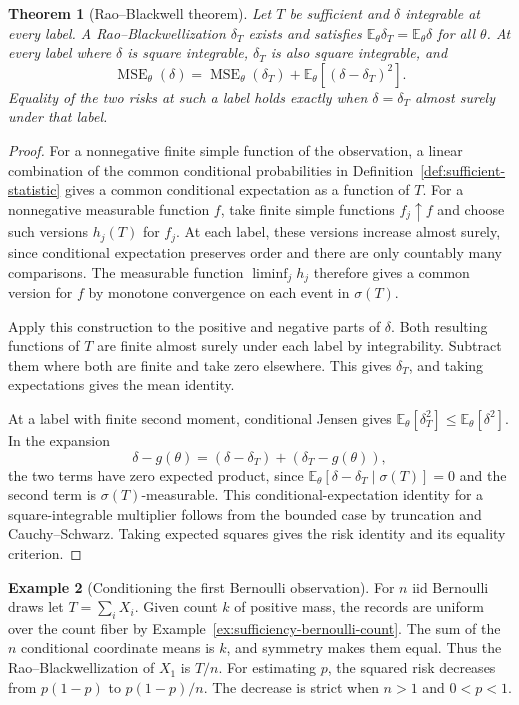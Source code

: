 \documentclass[11pt,oneside]{book}
\newtheorem{theorem}{Theorem}[chapter]
\theoremstyle{definition}
\newtheorem{example}[theorem]{Example}
\theoremstyle{remark}
\begin{document}
\begin{theorem}[Rao--Blackwell theorem]
\label{thm:rao-blackwell-squared-risk}
Let $T$ be sufficient and $\delta$ integrable at every label.
A Rao--Blackwellization $\delta_T$ exists and satisfies
$\mathbb E_\theta\delta_T=\mathbb E_\theta\delta$ for all $\theta$.
At every label where $\delta$ is square integrable, $\delta_T$ is
also square integrable, and
\[
\operatorname{MSE}_\theta(\delta)
=\operatorname{MSE}_\theta(\delta_T)
 +\mathbb E_\theta[(\delta-\delta_T)^2].
\]
Equality of the two risks at such a label holds exactly when
$\delta=\delta_T$ almost surely under that label.
\end{theorem}
\begin{proof}
For a nonnegative finite simple function of the observation,
a linear combination of the common conditional probabilities in
Definition~\ref{def:sufficient-statistic} gives a common conditional
expectation as a function of $T$. For a nonnegative measurable
function $f$, take finite simple functions $f_j\uparrow f$ and choose
such versions $h_j(T)$ for $f_j$. At each label, these versions
increase almost surely, since conditional expectation preserves
order and there are only countably many comparisons. The measurable
function $\liminf_j h_j$ therefore gives a common version for $f$
by monotone convergence on each event in $\sigma(T)$.

Apply this construction to the positive and negative parts of $\delta$.
Both resulting functions of $T$ are finite almost surely under each
label by integrability. Subtract them where both are finite and take
zero elsewhere. This gives $\delta_T$, and taking expectations
gives the mean identity.

At a label with finite second moment, conditional Jensen gives
$\mathbb E_\theta[\delta_T^2]\leq\mathbb E_\theta[\delta^2]$.
In the expansion
\[
\delta-g(\theta)=(\delta-\delta_T)+(\delta_T-g(\theta)),
\]
the two terms have zero expected product, since
$\mathbb E_\theta[\delta-\delta_T\mid\sigma(T)]=0$ and the second
term is $\sigma(T)$-measurable. This conditional-expectation
identity for a square-integrable multiplier follows from the bounded
case by truncation and Cauchy--Schwarz. Taking expected squares
gives the risk identity and its equality criterion.
\end{proof}

\begin{example}[Conditioning the first Bernoulli observation]
\label{ex:rao-blackwell-first-bernoulli}
For $n$ iid Bernoulli draws let $T=\sum_i X_i$. Given count $k$ of
positive mass, the records are uniform over the count fiber by
Example~\ref{ex:sufficiency-bernoulli-count}. The sum of the $n$
conditional coordinate means is $k$, and symmetry makes them
equal. Thus the Rao--Blackwellization of $X_1$ is $T/n$.
For estimating $p$, the squared risk decreases from $p(1-p)$
to $p(1-p)/n$. The decrease is strict when $n>1$ and $0<p<1$.
\end{example}
\end{document}
